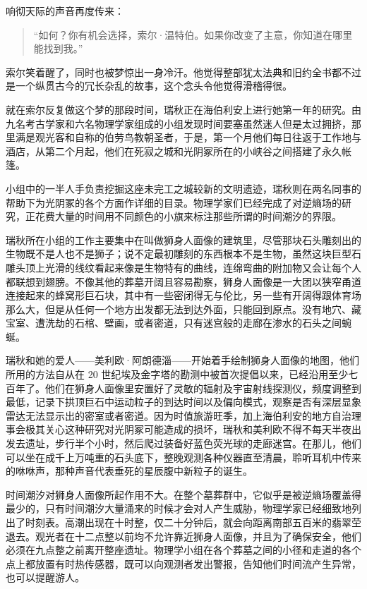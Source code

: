 \documentclass[AutoFakeBold=true]{book}
\begin{document}
响彻天际的声音再度传来：

\begin{quotation}
	{\kaishu ``如何？你有机会选择，索尔·温特伯。如果你改变了主意，你知道在哪里能找到我。''}
\end{quotation}

索尔笑着醒了，同时也被梦惊出一身冷汗。他觉得整部犹太法典和旧约全书都不过是一个纵贯古今的冗长杂乱的故事，这个念头令他觉得滑稽得很。

\vspace*{1em}

就在索尔反复做这个梦的那段时间，瑞秋正在海伯利安上进行她第一年的研究。由九名考古学家和六名物理学家组成的小组发现时间要塞虽然迷人但是太过拥挤，那里满是观光客和自称的伯劳鸟教朝圣者，于是，第一个月他们每日往返于工作地与酒店，从第二个月起，他们在死寂之城和光阴冢所在的小峡谷之间搭建了永久帐篷。

小组中的一半人手负责挖掘这座未完工之城较新的文明遗迹，瑞秋则在两名同事的帮助下为光阴冢的各个方面作详细的目录。物理学家们已经完成了对逆熵场的研究，正花费大量的时间用不同颜色的小旗来标注那些所谓的时间潮汐的界限。

瑞秋所在小组的工作主要集中在叫做狮身人面像的建筑里，尽管那块石头雕刻出的生物既不是人也不是狮子；说不定最初雕刻的东西根本不是生物，虽然这块巨型石雕头顶上光滑的线纹看起来像是生物特有的曲线，连绵弯曲的附加物又会让每个人都联想到翅膀。不像其他的葬墓开阔且容易勘察，狮身人面像是一大团以狭窄甬道连接起来的蜂窝形巨石块，其中有一些密闭得无与伦比，另一些有开阔得跟体育场那么大，但是从任何一个地方出发都无法到达外面，只能回到原点。没有地穴、藏宝室、遭洗劫的石棺、壁画，或者密道，只有迷宫般的走廊在渗水的石头之间蜿蜒。

瑞秋和她的爱人——美利欧·阿朗德淄——开始着手绘制狮身人面像的地图，他们所用的方法自从在 20 世纪埃及金字塔的勘测中被首次提倡以来，已经沿用至少七百年了。他们在狮身人面像里安置好了灵敏的辐射及宇宙射线探测仪，频度调整到最低，记录下拱顶巨石中运动粒子的到达时间以及偏向模式，观察是否有深层显象雷达无法显示出的密室或者密道。因为时值旅游旺季，加上海伯利安的地方自治理事会极其关心这种研究对光阴冢可能造成的损坏，瑞秋和美利欧不得不每天半夜出发去遗址，步行半个小时，然后爬过装备好蓝色荧光球的走廊迷宫。在那儿，他们可以坐在成千上万吨重的石头底下，整晚观测各种仪器直至清晨，聆听耳机中传来的咻咻声，那种声音代表垂死的星辰腹中新粒子的诞生。

时间潮汐对狮身人面像所起作用不大。在整个墓葬群中，它似乎是被逆熵场覆盖得最少的，只有时间潮汐大量涌来的时候才会对人产生威胁，物理学家已经细致地列出了时刻表。高潮出现在十时整，仅二十分钟后，就会向距离南部五百米的翡翠茔退去。观光者在十二点整以前均不允许靠近狮身人面像，并且为了确保安全，他们必须在九点整之前离开整座遗址。物理学小组在各个葬墓之间的小径和走道的各个点上都放置有时热传感器，既可以向观测者发出警报，告知他们时间流产生异常，也可以提醒游人。
\end{document}
